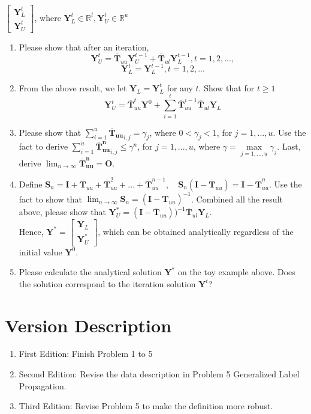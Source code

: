 \documentclass{article}
\begin{document}
$\begin{bmatrix}
\boldsymbol{Y}^{t}_L \\
\boldsymbol{Y}^{t}_U
\end{bmatrix}$, where $\boldsymbol{Y}^{t}_L \in \mathbb{R}^{l}, \boldsymbol{Y}^{t}_U \in \mathbb{R}^{u}$

\begin{enumerate}[resume]
\item Please show that after an iteration,
$$ \boldsymbol{Y}^{t}_U = \boldsymbol{\overline{T}}_{uu} \boldsymbol{Y}^{t-1}_U + \boldsymbol{\overline{T}}_{ul} \boldsymbol{Y}^{t-1}_L, t = 1,2,...,$$
$$\boldsymbol{Y}^{t}_L =  \boldsymbol{Y}^{t-1}_L, t = 1, 2,...$$
\item From the above result, we let $\boldsymbol{Y}_L=\boldsymbol{Y}^{t}_L$ for any $t$. Show that for $t \geq 1$ 
$$ \boldsymbol{Y}^{t}_U = \boldsymbol{\overline{T}}_{uu}^t \boldsymbol{Y}^{0} + \sum_{i=1}^t \boldsymbol{\overline{T}}_{uu}^{i-1} \boldsymbol{\overline{T}}_{ul} \boldsymbol{Y}_L$$

\item Please show that $\sum_{i=1}^u \boldsymbol{\overline{T}_{uu}}_{i,j} = \gamma_j$, where $0 < \gamma_j < 1$, for $j=1,...,u$. Use the fact to derive $\sum_{i=1}^u  \boldsymbol{\overline{T}_{uu}^n}_{i,j} \leq \gamma^n$, for $ j=1,...,u$, where $\gamma = \max\limits_{j=1,...,u} \gamma_j $. Last, derive $\lim_{n\to\infty} \boldsymbol{\overline{T}_{uu}^n} = \boldsymbol{O}$.


\item Define $\boldsymbol{S}_n = \boldsymbol{I} + \boldsymbol{\overline{T}}_{uu} + \boldsymbol{\overline{T}}_{uu}^2 + ... + \boldsymbol{\overline{T}}_{uu}^{n-1}, \quad \boldsymbol{S}_n(\boldsymbol{I}-\boldsymbol{\overline{T}}_{uu}) = \boldsymbol{I} - \boldsymbol{\overline{T}}_{uu}^{n}$. Use the fact to show that  
$\lim_{n\to\infty}\boldsymbol{S}_n = (\boldsymbol{I}-\boldsymbol{\overline{T}}_{uu})^{-1}$. Combined all the result above, please show that $\boldsymbol{Y}^{*}_U = (\boldsymbol{I}-\boldsymbol{\overline{T}}_{uu}))^{-1}\boldsymbol{\overline{T}}_{ul} \boldsymbol{Y}_L$. \\
Hence, $\boldsymbol{Y}^{*}=
\begin{bmatrix}
\boldsymbol{Y}_L \\
\boldsymbol{Y}^{*}_U
\end{bmatrix}
$, which can be obtained analytically regardless of the initial value $\boldsymbol{Y}^0$.

\item Please calculate the analytical solution $\boldsymbol{Y}^{*}$ on the toy example above. Does the solution correspond to the iteration solution $\boldsymbol{Y}^{t}$?
\end{enumerate}

 \section*{Version Description}
 \begin{enumerate}
     \item First Edition: Finish Problem 1 to 5
     \item Second Edition: Revise the data description in Problem 5 Generalized Label Propagation.
     \item Third Edition: Revise Problem 5 to make the definition more robust.
 \end{enumerate}
\end{document}
